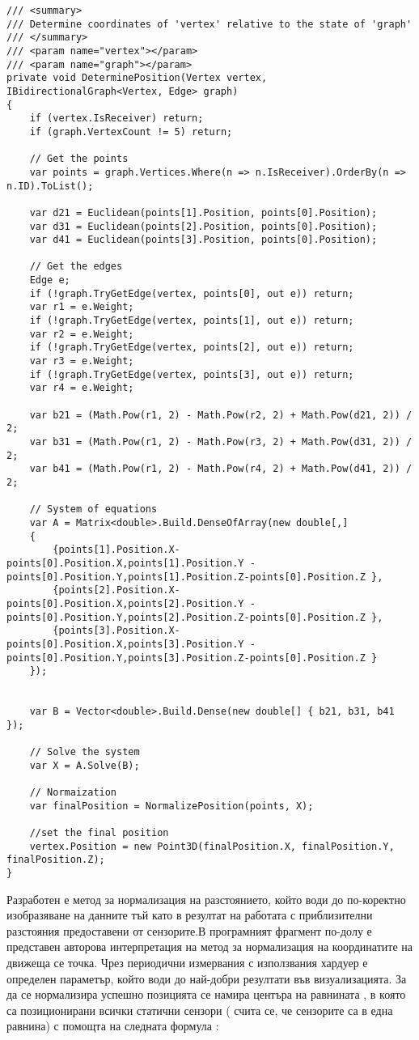 \begin{lstlisting}
/// <summary>
/// Determine coordinates of 'vertex' relative to the state of 'graph'
/// </summary>
/// <param name="vertex"></param>
/// <param name="graph"></param>
private void DeterminePosition(Vertex vertex, IBidirectionalGraph<Vertex, Edge> graph)
{
    if (vertex.IsReceiver) return;
    if (graph.VertexCount != 5) return;

    // Get the points
    var points = graph.Vertices.Where(n => n.IsReceiver).OrderBy(n => n.ID).ToList();

    var d21 = Euclidean(points[1].Position, points[0].Position);
    var d31 = Euclidean(points[2].Position, points[0].Position);
    var d41 = Euclidean(points[3].Position, points[0].Position);

    // Get the edges
    Edge e;
    if (!graph.TryGetEdge(vertex, points[0], out e)) return;
    var r1 = e.Weight;
    if (!graph.TryGetEdge(vertex, points[1], out e)) return;
    var r2 = e.Weight;
    if (!graph.TryGetEdge(vertex, points[2], out e)) return;
    var r3 = e.Weight;
    if (!graph.TryGetEdge(vertex, points[3], out e)) return;
    var r4 = e.Weight;

    var b21 = (Math.Pow(r1, 2) - Math.Pow(r2, 2) + Math.Pow(d21, 2)) / 2;
    var b31 = (Math.Pow(r1, 2) - Math.Pow(r3, 2) + Math.Pow(d31, 2)) / 2;
    var b41 = (Math.Pow(r1, 2) - Math.Pow(r4, 2) + Math.Pow(d41, 2)) / 2;

    // System of equations
    var A = Matrix<double>.Build.DenseOfArray(new double[,]
    {
        {points[1].Position.X-points[0].Position.X,points[1].Position.Y - points[0].Position.Y,points[1].Position.Z-points[0].Position.Z },
        {points[2].Position.X-points[0].Position.X,points[2].Position.Y - points[0].Position.Y,points[2].Position.Z-points[0].Position.Z },
        {points[3].Position.X-points[0].Position.X,points[3].Position.Y - points[0].Position.Y,points[3].Position.Z-points[0].Position.Z }
    });
    
    
    var B = Vector<double>.Build.Dense(new double[] { b21, b31, b41 });
    
    // Solve the system
    var X = A.Solve(B);

    // Normaization
    var finalPosition = NormalizePosition(points, X);
    
    //set the final position
    vertex.Position = new Point3D(finalPosition.X, finalPosition.Y, finalPosition.Z);
}
\end{lstlisting}

Разработен е метод за нормализация на разстоянието, който води до по-коректно изобразяване на данните тъй като в резултат на работата с приблизителни разстояния предоставени от сензорите.В програмният фрагмент по-долу е представен авторова интерпретация на метод за нормализация на координатите на движеща се точка. Чрез периодични измервания с използвания хардуер е определен параметър, който води до най-добри резултати във визуализацията. За да се нормализира успешно позицията се намира центъра на равнината \cite{centroid}, в която са позиционирани всички статични сензори ( счита се, че сензорите са в една равнина) с помощта на следната формула :

